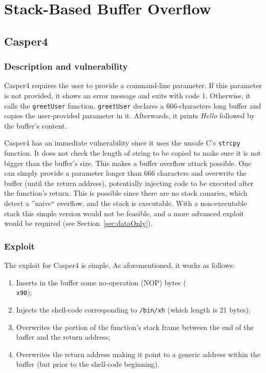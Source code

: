 \section{Stack-Based Buffer Overflow}
\subsection{Casper4}
\subsubsection{Description and vulnerability}
Casper4 requires the user to provide a command-line parameter. If this parameter is not provided, it shows an error message and exits with code 1. Otherwise, it calls the \texttt{greetUser} function. \texttt{greetUser} declares a 666-characters long buffer and copies the user-provided parameter in it. Afterwards, it prints \textit{Hello} followed by the buffer's content.

Casper4 has an immediate vulnerability since it uses the unsafe C's \texttt{strcpy} function. It does not check the length of string to be copied to make sure it is not bigger than the buffer's size. This makes a buffer overflow attack possible. One can simply provide a parameter longer than 666 characters and overwrite the buffer (until the return address), potentially injecting code to be executed after the function's return. This is possible since there are no stack canaries, which detect a ''naive`` overflow, and the stack is executable. With a non-executable stack this simple version would not be feasible, and a more advanced exploit would be required (see Section~\ref{sec:dataOnly}).

\subsubsection{Exploit}
The exploit for Casper4 is simple. As aforementioned, it works as follows:
\begin{enumerate}
	\item Inserts in the buffer some no-operation (NOP) bytes (\texttt{\\x90});
	\item Injects the shell-code corresponding to \texttt{/bin/xh} (which length is 21 bytes);
	\item Overwrites the portion of the function's stack frame between the end of the buffer and the return address;
	\item Overwrites the return address making it point to a generic address within the buffer (but prior to the shell-code beginning).
\end{enumerate}

